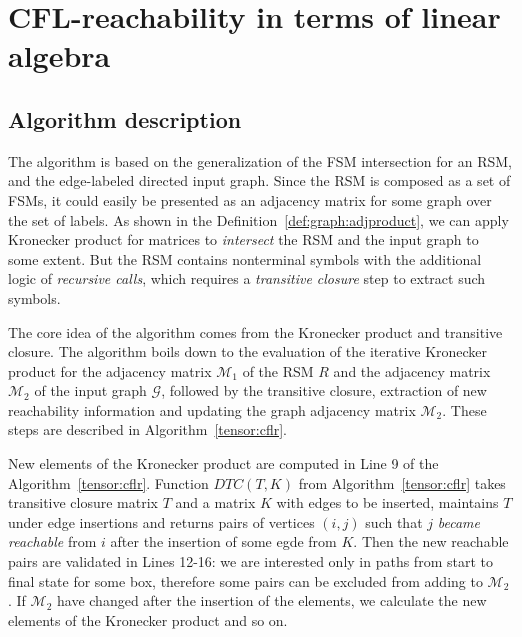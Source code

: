 \section{CFL-reachability in terms of linear algebra}
\label{sec:algo}

\subsection{Algorithm description}
The algorithm is based on the generalization of the FSM intersection for an RSM,  and the edge-labeled directed input graph.
Since the RSM is composed as a set of FSMs, it could easily be presented as an adjacency matrix for some graph over the set of labels.
As shown in the Definition~\ref{def:graph:adjproduct}, we can apply Kronecker product for matrices to \textit{intersect} the RSM and the input graph to some extent.
But the RSM contains nonterminal symbols with the additional logic of \textit{recursive calls}, which requires a \textit{transitive closure} step to extract such symbols.

The core idea of the algorithm comes from the Kronecker product and transitive closure.
The algorithm boils down to the evaluation of the iterative Kronecker product for the adjacency matrix $\mathcal{M}_1$ of the RSM $R$ and the adjacency matrix $\mathcal{M}_2$ of the  input graph $\mathcal{G}$, followed by the transitive closure, extraction of new reachability information and updating the graph adjacency matrix $\mathcal{M}_2$. These steps are described in Algorithm~\ref{tensor:cflr}.

New elements of the Kronecker product are computed in Line 9 of the Algorithm~\ref{tensor:cflr}. Function $DTC(T, K)$ from Algorithm~\ref{tensor:cflr} takes transitive closure matrix $T$ and a matrix $K$ with edges to be inserted, maintains $T$ under edge insertions and returns pairs of vertices $(i,j)$ such that $j$ \textit {became reachable} from $i$ after the insertion of some egde from $K$. Then the new reachable pairs are validated in Lines 12-16: we are interested only in paths from start to final state for some box, therefore some pairs can be excluded from adding to $\mathcal{M}_2$. If $\mathcal{M}_2$ have changed after the insertion of the elements, we calculate the new elements of the Kronecker product and so on. 

